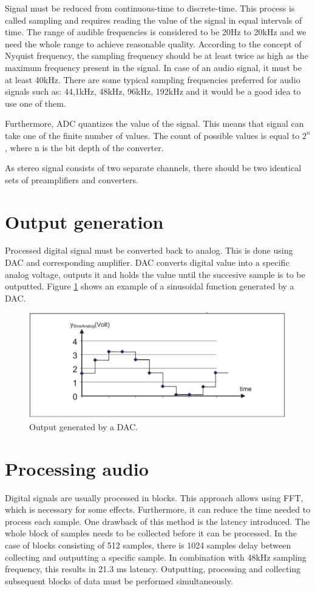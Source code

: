 \documentclass[a4paper,twoside,12pt]{book}
\begin{document}
Signal must be reduced from continuous-time to discrete-time.
This process is called sampling and requires reading the value of the signal in equal intervals of time.
The range of audible frequencies is considered to be 20Hz to 20kHz
and we need the whole range to achieve reasonable quality.
According to the concept of Nyquist frequency, the sampling frequency should be at least
twice as high as the maximum frequency present in the signal.
In case of an audio signal, it must be at least 40kHz.
There are some typical sampling frequencies preferred for audio signals such as: 44,1kHz, 48kHz,
96kHz, 192kHz and it would be a good idea to use one of them.

Furthermore, ADC quantizes the value of the signal.
This means that signal can take one of the finite number of values.
The count of possible values is equal to \(2^n\), where n is the bit depth of the converter.

As stereo signal consists of two separate channels,
there should be two identical sets of preamplifiers and converters.

\section{Output generation}
Processed digital signal must be converted back to analog.
This is done using DAC and corresponding amplifier.
DAC converts digital value into a specific analog voltage,
outputs it and holds the value until the succesive sample is to be outputted.
Figure \ref{fig:sine} shows an example of a sinusoidal
function generated by a DAC.

\begin{figure}[H]
    \centering
    \includegraphics[width=\textwidth]{images/DAC_sine}
    \caption{Output generated by a DAC\cite{ST:DAC2}.}
    \label{fig:sine}
\end{figure}

\section{Processing audio}
Digital signals are usually processed in blocks.
This approach allows using FFT, which is necessary for some effects.
Furthermore, it can reduce the time needed to process each sample.
One drawback of this method is the latency introduced.
The whole block of samples needs to be collected before it can be processed.
In the case of blocks consisting of 512 samples,
there is 1024 samples delay between collecting and outputting a specific sample.
In combination with 48kHz sampling frequency, this results in 21.3 ms latency.
Outputting, processing and collecting subsequent blocks of data
must be performed simultaneously.
\end{document}
